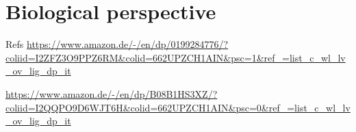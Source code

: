 \chapter{Biological perspective}
Refs
\url{https://www.amazon.de/-/en/dp/0199284776/?coliid=I2ZFZ3O9PPZ6RM&colid=662UPZCH1AIN&psc=1&ref_=list_c_wl_lv_ov_lig_dp_it}
    
\url{https://www.amazon.de/-/en/dp/B08B1HS3XZ/?coliid=I2QQPO9D6WJT6H&colid=662UPZCH1AIN&psc=0&ref_=list_c_wl_lv_ov_lig_dp_it}